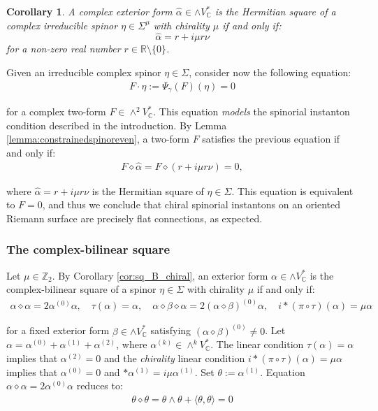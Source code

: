 \documentclass[10pt,a4paper,twoside,reqno]{amsart}
\theoremstyle{plain}
\newtheorem{cor}[thm]{Corollary}
\theoremstyle{definition}
\theoremstyle{remark}
\def\C{\mathbb{C}}
\def\R{\mathbb{R}}
\def\R{\mathbb{R}}
\newcommand{\escal}[1]{\langle#1\rangle}
\begin{document}
\begin{cor}
A complex exterior form $\widehat{\alpha} \in\wedge V^*_\C$ is the Hermitian square of a complex irreducible spinor $\eta\in\Sigma^{\mu}$ with chirality $\mu$ if and only if: $$\widehat{\alpha} = r+i\mu r\nu$$ for a non-zero real number $r\in\R\setminus\{0\}$.
\end{cor}

Given an irreducible complex spinor $\eta\in \Sigma$, consider now the following equation:
\begin{eqnarray*}
F\cdot \eta := \Psi_{\gamma}(F)(\eta) = 0
\end{eqnarray*}

\noindent
for a complex two-form $F\in \wedge^2 V^{\ast}_{\mathbb{C}}$. This equation \emph{models} the spinorial instanton condition described in the introduction. By Lemma \ref{lemma:constrainedspinoreven}, a two-form $F$ satisfies the previous equation if and only if:
\begin{eqnarray*}
F\diamond \widehat{\alpha} = F\diamond (r+i\mu r\nu) = 0,
\end{eqnarray*}

\noindent
where $\widehat{\alpha} = r+i\mu r\nu$ is the Hermitian square of $\eta\in \Sigma$. This equation is equivalent to $F = 0$, and thus we conclude that chiral spinorial instantons on an oriented Riemann surface are precisely flat connections, as expected.
 

\subsubsection{The complex-bilinear square}


Let $\mu\in\mathbb{Z}_2$. By Corollary \ref{cor:sq_B_chiral}, an exterior form $\alpha\in\wedge V^*_\C$ is the complex-bilinear square of a spinor $\eta \in\Sigma$ with chirality $\mu$ if and only if:
\begin{eqnarray*}
\alpha\diamond\alpha=2\alpha^{(0)}\alpha,\quad\tau(\alpha)=\alpha,\quad\alpha\diamond\beta\diamond\alpha=2(\alpha\diamond\beta)^{(0)}\alpha,\quad i*(\pi\circ\tau)(\alpha)=\mu\alpha    
\end{eqnarray*}

\noindent
for a fixed exterior form $\beta\in\wedge V^*_\C$ satisfying $(\alpha\diamond\beta)^{(0)}\neq0$. Let $\alpha = \alpha^{(0)} + \alpha^{(1)} +\alpha^{(2)}$, where $\alpha^{(k)}\in\wedge^kV^*_\C$. The linear condition $\tau(\alpha)=\alpha$ implies that $\alpha^{(2)}=0$ and the \emph{chirality} linear condition $i*(\pi\circ\tau)(\alpha)=\mu\alpha$ implies that $\alpha^{(0)}=0$ and $*\alpha^{(1)}=i\mu\alpha^{(1)}$. Set $\theta:=\alpha^{(1)}$. Equation $\alpha\diamond\alpha=2\alpha^{(0)}\alpha$ reduces to:
\begin{eqnarray*}
\theta\diamond\theta=\theta\wedge\theta+\escal{\theta,\theta}=0   
\end{eqnarray*}
\end{document}
